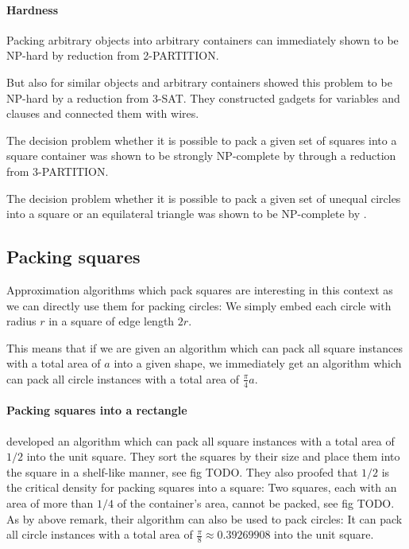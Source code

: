\paragraph{Hardness}

Packing arbitrary objects into arbitrary containers can immediately shown to be NP-hard by reduction from \textsc{2-PARTITION}.

But also for similar objects and arbitrary containers \textcite{FPT1981optimal} showed this problem to be NP-hard by a reduction from \textsc{3-SAT}. They constructed gadgets for variables and clauses and connected them with wires.

The decision problem whether it is possible to pack a given set of squares into a square container was shown to be strongly NP-complete by \textcite{LTWYC1990packing} through a reduction from \textsc{3-PARTITION}.

The decision problem whether it is possible to pack a given set of unequal circles into a square or an equilateral triangle was shown to be NP-complete by \textcite{DFL2010circle}.

\subsection{Packing squares}

Approximation algorithms which pack squares are interesting in this context as we can directly use them for packing circles: We simply embed each circle with radius $r$ in a square of edge length $2r$.

This means that if we are given an algorithm which can pack all square instances with a total area of $a$ into a given shape, we immediately get an algorithm which can pack all circle instances with a total area of $\frac{\pi}{4}a$.

\paragraph{Packing squares into a rectangle}

\textcite{MM1967some} developed an algorithm which can pack all square instances with a total area of $1/2$ into the unit square.
They sort the squares by their size and place them into the square in a shelf-like manner, see fig TODO.
They also proofed that $1/2$ is the critical density for packing squares into a square: Two squares, each with an area of more than $1/4$ of the container's area, cannot be packed, see fig TODO.
As by above remark, their algorithm can also be used to pack circles: It can pack all circle instances with a total area of $\frac{\pi}{8} \approx 0.39269908$ into the unit square.

